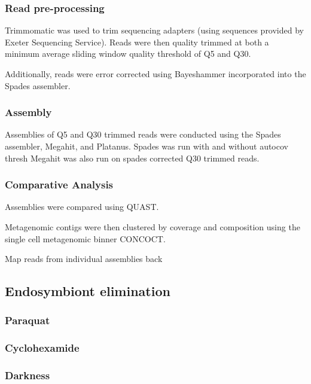 \subsubsection{Read pre-processing}

Trimmomatic was used to trim sequencing adapters (using sequences
provided by Exeter Sequencing Service).
Reads were then quality trimmed at both a minimum average sliding window
quality threshold of Q5 and Q30. 

Additionally, reads were error corrected using Bayeshammer incorporated into 
the Spades assembler. 

\subsubsection{Assembly}

Assemblies of Q5 and Q30 trimmed reads were conducted using
the Spades assembler, Megahit, and Platanus. 
Spades was run with and without autocov thresh
Megahit was also run on spades corrected Q30 trimmed reads. 

\subsubsection{Comparative Analysis}

Assemblies were compared using QUAST.



Metagenomic contigs were then clustered by coverage
and composition using the single cell metagenomic binner CONCOCT.


Map reads from individual assemblies back




\subsection{Endosymbiont elimination}

\subsubsection{Paraquat}

\subsubsection{Cyclohexamide}

\subsubsection{Darkness}




